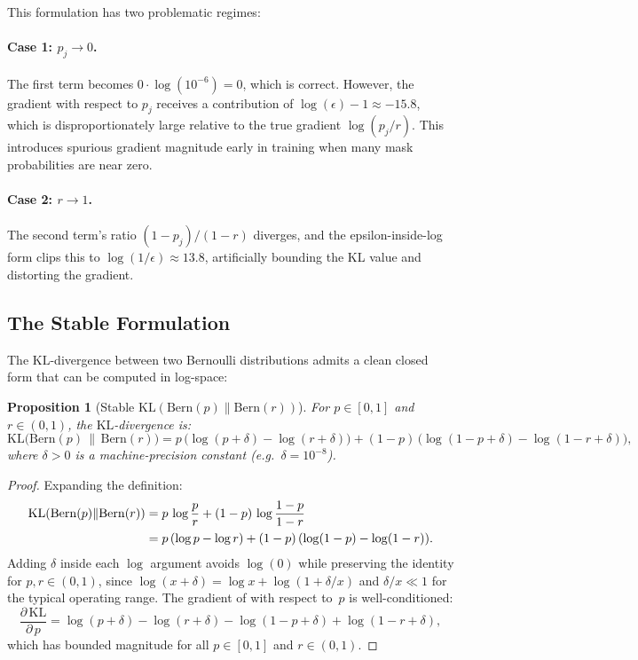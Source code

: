 \documentclass[11pt,a4paper]{article}
\newtheorem{proposition}{Proposition}
\newcommand{\KL}{\mathrm{KL}}
\newcommand{\Bern}{\mathrm{Bern}}
\begin{document}
This formulation has two problematic regimes:

\paragraph{Case 1: $p_j \to 0$.}
The first term becomes $0 \cdot \log(10^{-6}) = 0$, which is
correct. However, the gradient with respect to $p_j$ receives a
contribution of
$\log(\epsilon) - 1 \approx -15.8$, which is disproportionately large
relative to the true gradient $\log(p_j/r)$. This introduces spurious
gradient magnitude early in training when many mask probabilities are
near zero.

\paragraph{Case 2: $r \to 1$.}
The second term's ratio $(1 - p_j)/(1 - r)$ diverges, and the
epsilon-inside-log form clips this to $\log(1/\epsilon) \approx 13.8$,
artificially bounding the KL value and distorting the gradient.

\subsection{The Stable Formulation}

The $\KL$-divergence between two Bernoulli distributions admits a clean
closed form that can be computed in log-space:

\begin{proposition}[Stable $\KL(\Bern(p) \| \Bern(r))$]
\label{prop:kl_stable}
For $p \in [0,1]$ and $r \in (0,1)$, the $\KL$-divergence is:
\begin{equation}
\label{eq:kl_stable}
\KL\!\big(\Bern(p) \,\|\, \Bern(r)\big)
  = p\,\big(\log(p + \delta) - \log(r + \delta)\big)
  + (1 - p)\,\big(\log(1 - p + \delta) - \log(1 - r + \delta)\big),
\end{equation}
where $\delta > 0$ is a machine-precision constant (e.g.\
$\delta = 10^{-8}$).
\end{proposition}

\begin{proof}
Expanding the definition:
\begin{align}
\KL(\Bern(p) \| \Bern(r))
  &= p\,\log\frac{p}{r} + (1 - p)\,\log\frac{1 - p}{1 - r}
    \notag\\
  &= p\,(\log p - \log r) + (1 - p)\,(\log(1 - p) - \log(1 - r)).
    \label{eq:kl_expanded}
\end{align}
Adding $\delta$ inside each $\log$ argument avoids $\log(0)$ while
preserving the identity for $p, r \in (0, 1)$, since
$\log(x + \delta) = \log x + \log(1 + \delta/x)$ and
$\delta/x \ll 1$ for the typical operating range. The gradient of
\Cref{eq:kl_stable} with respect to~$p$ is well-conditioned:
\begin{equation}
\frac{\partial\, \KL}{\partial\, p}
  = \log(p + \delta) - \log(r + \delta)
    - \log(1 - p + \delta) + \log(1 - r + \delta),
\end{equation}
which has bounded magnitude for all $p \in [0, 1]$ and $r \in (0, 1)$.
\end{proof}
\end{document}
